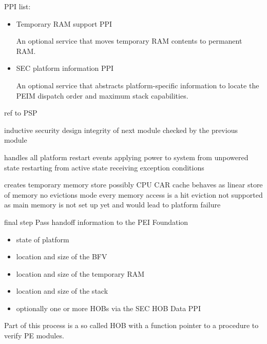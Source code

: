 \begin{enumerate}
    PPI list:
    \begin{itemize}

        \item Temporary RAM support PPI

              An optional service that moves temporary RAM contents to permanent RAM.

        \item SEC platform information PPI

              An optional service that abstracts platform-specific information to locate the PEIM dispatch order and maximum stack capabilities.
    \end{itemize}


    ref to PSP

    inductive security design
    integrity of next module checked by the previous module

    handles all platform restart events
    applying power to system from unpowered state
    restarting from active state
    receiving exception conditions

    creates temporary memory store
    possibly CPU \ac{CAR}
    cache behaves as linear store of memory
    no evictions mode
    every memory access is a hit
    eviction not supported as main memory is not set up yet and would lead to platform failure


    final step
    Pass handoff information to the \ac{PEI} Foundation
    \begin{itemize}
        \item state of platform
        \item location and size of the \ac{BFV}
        \item location and size of the temporary RAM
        \item location and size of the stack
        \item optionally one or more \acp{HOB} via the \ac{SEC} \ac{HOB} Data \ac{PPI}
    \end{itemize}


    Part of this process is a so called \ac{HOB} with a function pointer to a procedure to verify PE modules.


\end{enumerate}
